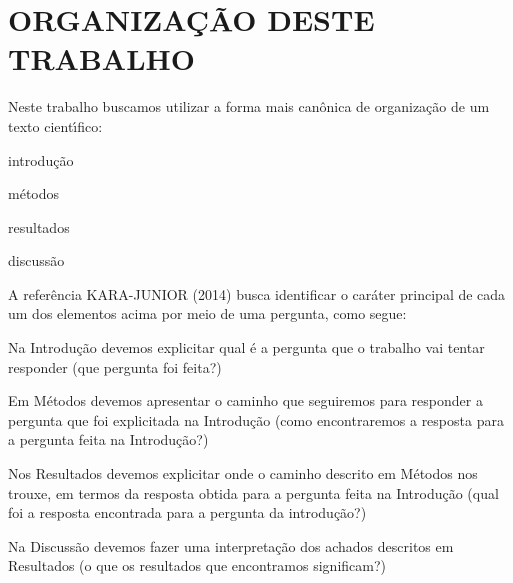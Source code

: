 \documentclass[
12pt,		%
openright,	%
twoside,  %
a4paper,			%
chapter=TITLE,		%
english,			%
french,				%
spanish,			%
brazil				%
]{USPSC-classe/USPSC}
\begin{document}
\chapter[ORGANIZA\c{C}\~AO DESTE TRABALHO]{ORGANIZA\c{C}\~AO DESTE TRABALHO}\label{ORGANIZA\c{C}\~AO DESTE TRABALHO}
Neste trabalho buscamos utilizar a forma mais can\^onica de organiza\c{c}\~ao de um texto cient\'{\i}fico:











\begin{alineas}
\item introdu\c{c}\~ao
\item m\'etodos
\item resultados
\item discuss\~ao
\end{alineas}

A refer\^encia KARA-JUNIOR (2014) busca identificar o car\'ater principal de cada um dos elementos acima por meio de uma pergunta, como segue:











\begin{alineas}
\item Na Introdu\c{c}\~ao devemos explicitar qual \'e a pergunta que o trabalho vai tentar responder   (\textquotedbl que pergunta foi feita?\textquotedbl )
\item Em M\'etodos devemos apresentar o caminho que seguiremos para responder a pergunta que foi explicitada na Introdu\c{c}\~ao (\textquotedbl como encontraremos a resposta para a pergunta feita na Introdu\c{c}\~ao?\textquotedbl )
\item Nos Resultados devemos explicitar onde o caminho descrito em M\'etodos nos trouxe, em termos da resposta obtida para a pergunta feita na Introdu\c{c}\~ao (\textquotedbl qual foi a resposta encontrada para a pergunta da introdu\c{c}\~ao?\textquotedbl )
\item Na Discuss\~ao devemos fazer uma interpreta\c{c}\~ao dos achados descritos em Resultados (\textquotedbl o que os resultados que encontramos significam?\textquotedbl )
\end{alineas}
\end{document}
